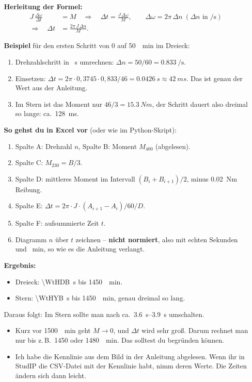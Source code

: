 \documentclass[11pt,a4paper]{article}
\begin{document}
\textbf{Herleitung der Formel:}
\begin{align*}
J\,\frac{\Delta\omega}{\Delta t} &= M
\quad\Rightarrow\quad \Delta t = \frac{J\,\Delta\omega}{M},
\qquad \Delta\omega = 2\pi\,\Delta n \;(\Delta n \text{ in } \si{\per\second})\\
\Rightarrow\quad \Delta t &= \frac{2\pi\,J\,\Delta n}{M}.
\end{align*}

\textbf{Beispiel} für den ersten Schritt von 0 auf \SI{50}{\per\minute} im Dreieck:
\begin{enumerate}
\item Drehzahlschritt in \si{\per\second} umrechnen: $\Delta n = 50/60 = \SI{0,833}{\per\second}$.
\item Einsetzen: $\Delta t = 2\pi\cdot 0{,}3745\cdot 0{,}833 / 46 = \SI{0,0426}{s}
      \approx \SI{42}{ms}$. Das ist genau der Wert aus der Anleitung.
\item Im Stern ist das Moment nur $46/3 = \SI{15,3}{Nm}$, der Schritt dauert also
      dreimal so lange: ca.\ \SI{128}{ms}.
\end{enumerate}

\textbf{So gehst du in Excel vor} (oder wie im Python-Skript):
\begin{enumerate}
\item Spalte A: Drehzahl $n$, Spalte B: Moment $M_{400}$ (abgelesen).
\item Spalte C: $M_{230} = B/3$.
\item Spalte D: mittleres Moment im Intervall $(B_i + B_{i+1})/2$, minus \SI{0,02}{Nm} Reibung.
\item Spalte E: $\Delta t = 2\pi\cdot J\cdot (A_{i+1}-A_i)/60 / D$.
\item Spalte F: aufsummierte Zeit $t$.
\item Diagramm $n$ über $t$ zeichnen -- \textbf{nicht normiert}, also mit echten
      Sekunden und \si{\per\minute}, so wie es die Anleitung verlangt.
\end{enumerate}

\textbf{Ergebnis:}
\begin{itemize}
\item Dreieck: \SI{\WtHDB}{s} bis \SI{1450}{\per\minute}.
\item Stern: \SI{\WtHYB}{s} bis \SI{1450}{\per\minute}, genau dreimal so lang.
\end{itemize}
Daraus folgt: Im Stern sollte man nach ca.\ \SIrange{3,6}{3,9}{s} umschalten.

\begin{achtung}
\begin{itemize}
\item Kurz vor \SI{1500}{\per\minute} geht $M \to 0$, und $\Delta t$ wird sehr groß. Darum
      rechnet man nur bis z.\,B.\ \SI{1450}{} oder \SI{1480}{\per\minute}. Das solltest du
      begründen können.
\item Ich habe die Kennlinie aus dem Bild in der Anleitung abgelesen. Wenn ihr in StudIP
      die CSV-Datei mit der Kennlinie habt, nimm deren Werte. Die Zeiten ändern sich dann leicht.
\end{itemize}
\end{achtung}
\end{document}
